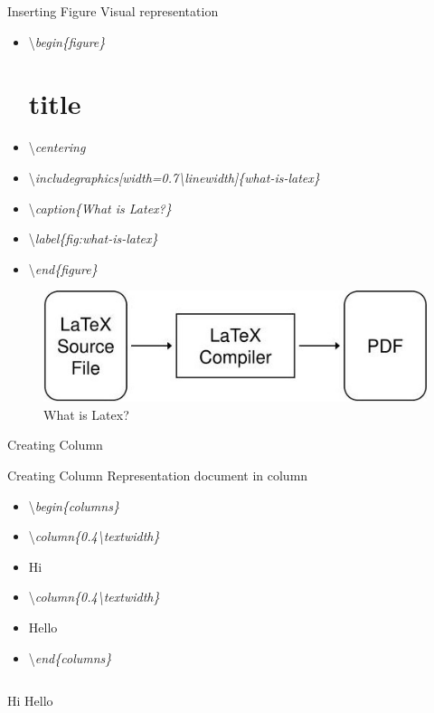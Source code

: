 \documentclass[11pt]{beamer}
\begin{document}
	\begin{frame}{Inserting Figure}
		Visual representation
		\begin{itemize}
			\item[] \textbackslash \textit{begin\{figure\}}
			\part{title}		\item[] \textbackslash \textit{centering}
			\item[] \textbackslash \textit{includegraphics[width=0.7\textbackslash linewidth]\{what-is-latex\}}
			\item[] \textbackslash \textit{caption\{What is Latex?\}}
			\item[] \textbackslash \textit{label\{fig:what-is-latex\}}
			\item[] \textbackslash \textit{end\{figure\}} 
		\end{itemize}
		\begin{figure}
			\centering
			\includegraphics[width=0.7\linewidth]{Images/what-is-latex}
			\caption{What is Latex?}
			\label{fig:what-is-latex1}
		\end{figure}
	\end{frame}
	\begin{frame}{}
		\begin{center}
			\huge {Creating Column}
		\end{center}	
	\end{frame}
	\begin{frame}{Creating Column}
		Representation document in column
		\begin{itemize}
			\item[] \textbackslash \textit{begin\{columns\}}
			\item[] \textbackslash \textit{column\{0.4\textbackslash textwidth\}}
			\item[] Hi
			\item[] \textbackslash \textit{column\{0.4\textbackslash textwidth\}}
			\item[] Hello
			\item[] \textbackslash \textit{end\{columns\}} 
		\end{itemize}
		\begin{columns}
			Hi
			Hello
		\end{columns}
	\end{frame}
\end{document}
